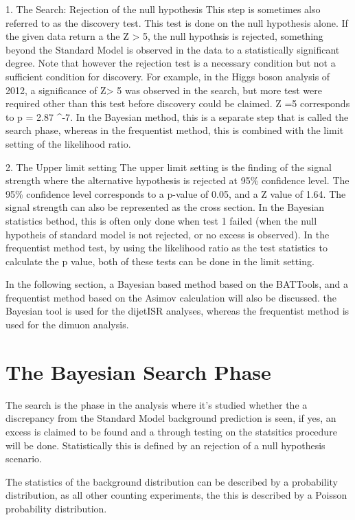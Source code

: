 1.  The Search: Rejection of the null hypothesis
This step is sometimes also referred to as the discovery test. This test is done on the null hypothesis alone. If the given data return a the Z > 5, the null hypothsis is rejected, something beyond the Standard Model is observed in the data to a statistically significant degree. Note that however the rejection test is a necessary condition but not a sufficient condition for discovery. For example, in the Higgs boson analysis of 2012, a significance of Z> 5 was observed in the search, but more test
were required other than this test before discovery could be claimed. Z =5 corresponds to p = 2.87 ^{-7}.
In the Bayesian method, this is a separate step that is called the search phase, whereas in the frequentist method, this is combined with the limit setting of the likelihood ratio. 

2. The Upper limit setting
The upper limit setting is the finding of the signal strength where the alternative hypothesis is rejected at 95\% confidence level. The 95\% confidence level corresponds to a p-value of 0.05, and a Z value of 1.64. The signal strength can also be represented as the cross section. 
In the Bayesian statistics bethod, this is often only done when test 1 failed (when the null hypotheis of standard model is not rejected, or no excess is observed). In the frequentist method test, by using the likelihood ratio as the test statistics to calculate the p value, both of these tests can be done in the limit setting. 

In the following section, a Bayesian based method based on the BATTools, and a frequentist method based on the Asimov calculation will also be discussed. 
the Bayesian tool is used for the dijetISR analyses, whereas the frequentist method is used for the dimuon analysis. 


\section{The Bayesian Search Phase}
    The search is the phase in the analysis where it's studied whether the a discrepancy from the Standard Model background prediction is seen, if yes, an excess is claimed to be found and a through testing on the statsitics procedure will be done. Statistically this is defined by an rejection of a null hypothesis scenario.

    The statistics of the background distribution can be described by a probability distribution, as all other counting experiments, the this is described by a Poisson probability distribution. 

